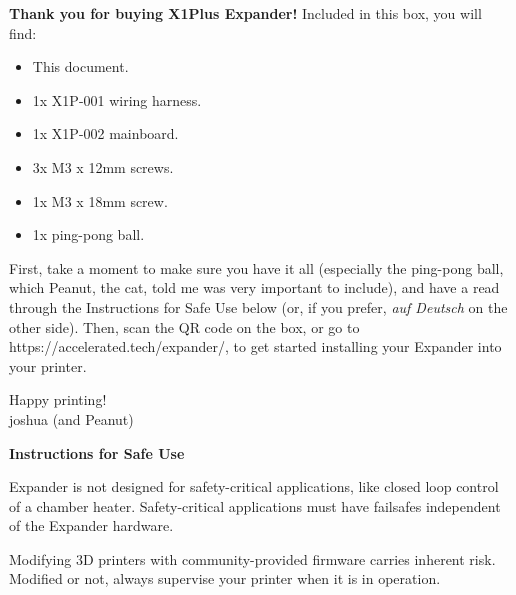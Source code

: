 \documentclass{article}
\begin{document}
\fontsize{10}{10}\selectfont

\textbf{Thank you for buying X1Plus Expander!}  Included in this box, you will find:

\fontsize{9}{9}\selectfont
\begin{multicols}{2}
\begin{itemize}
\item{This document.}
\vspace{-3pt}
\item{1x X1P-001 wiring harness.}
\vspace{-3pt}
\item{1x X1P-002 mainboard.}
\vspace{-3pt}
\item{3x M3 x 12mm screws.}
\vspace{-3pt}
\item{1x M3 x 18mm screw.}
\vspace{-3pt}
\item{1x ping-pong ball.}
\vspace{-3pt}
\end{itemize}
\end{multicols}
\fontsize{10}{10}\selectfont

\vspace{-8pt}

First, take a moment to make sure you have it all (especially the ping-pong
ball, which Peanut, the cat, told me was very important to include), and
have a read through the Instructions for Safe Use below (or, if you prefer,
\textit{auf Deutsch} on the other side).  Then, scan the QR
code on the box, or go to https://accelerated.tech/expander/, to get started
installing your Expander into your printer.

\hspace*{3in}Happy printing! \\
\hspace*{3in}joshua (and Peanut)

\begin{center}
\fontsize{14}{14}\selectfont
\textbf{Instructions for Safe Use}
\end{center}

\fontsize{8}{8}\selectfont
Expander is not designed for safety-critical applications, like closed loop
control of a chamber heater.  Safety-critical applications must have
failsafes independent of the Expander hardware.

Modifying 3D printers with
community-provided firmware carries inherent risk.  Modified or not, always
supervise your printer when it is in operation.
\end{document}
